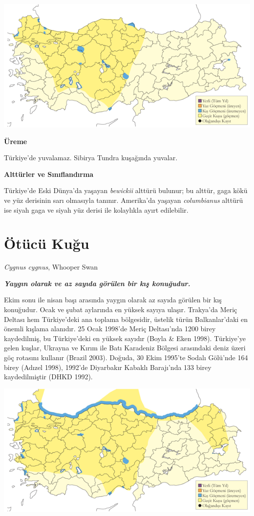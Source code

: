 \documentclass[
  letterpaper,
  DIV=11,
  numbers=noendperiod]{scrreprt}
\begin{document}
\includegraphics{images/harita_Page_009.png}

\textbf{Üreme}

Türkiye'de yuvalamaz. Sibirya Tundra kuşağında yuvalar.

\textbf{Alttürler ve Sınıflandırma}

Türkiye'de Eski Dünya'da yaşayan \emph{bewickii} alttürü bulunur; bu
alttür, gaga kökü ve yüz derisinin sarı olmasıyla tanınır. Amerika'da
yaşayan \emph{columbianus} alttürü ise siyah gaga ve siyah yüz derisi
ile kolaylıkla ayırt edilebilir.

\section{Ötücü Kuğu}\label{uxf6tuxfccuxfc-kuux11fu}

\emph{Cygnus cygnus}, Whooper Swan

\textbf{\emph{Yaygın olarak ve az sayıda görülen bir kış konuğudur.}}

Ekim sonu ile nisan başı arasında yaygın olarak az sayıda görülen bir
kış konuğudur. Ocak ve şubat aylarında en yüksek sayıya ulaşır.
Trakya'da Meriç Deltası hem Türkiye'deki ana toplama bölgesidir, üstelik
türün Balkanlar'daki en önemli kışlama alanıdır. 25 Ocak 1998'de Meriç
Deltası'nda 1200 birey kaydedilmiş, bu Türkiye'deki en yüksek sayıdır
(Boyla \& Eken 1998). Türkiye'ye gelen kuşlar, Ukrayna ve Kırım ile Batı
Karadeniz Bölgesi arasındaki deniz üzeri göç rotasını kullanır (Brazil
2003). Doğuda, 30 Ekim 1995'te Sodalı Gölü'nde 164 birey (Adızel 1998),
1992'de Diyarbakır Kabaklı Barajı'nda 133 birey kaydedilmiştir (DHKD
1992).

\includegraphics{images/harita_Page_010.png}
\end{document}

